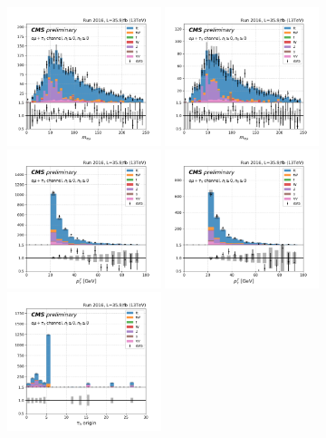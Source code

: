 \begin{figure}
    \centering
    \includegraphics[width=0.4\textwidth]{chapters/Analysis/sectionCalibration/figures/jetToTauh/emutau_dilepton_mass_pickles_lltauTight.png}
    \includegraphics[width=0.4\textwidth]{chapters/Analysis/sectionCalibration/figures/jetToTauh/emutau_dilepton_mass_pickles_lltauVTight.png}
    \includegraphics[width=0.4\textwidth]{chapters/Analysis/sectionCalibration/figures/jetToTauh/emutau_tauPt_pickles_lltauTight.png}
    \includegraphics[width=0.4\textwidth]{chapters/Analysis/sectionCalibration/figures/jetToTauh/emutau_tauPt_pickles_lltauVTight.png}
    \includegraphics[width=0.4\textwidth]{chapters/Analysis/sectionCalibration/figures/jetToTauh/emutau_tauGenFlavor_pickles_lltauTight.png}

\end{figure}
